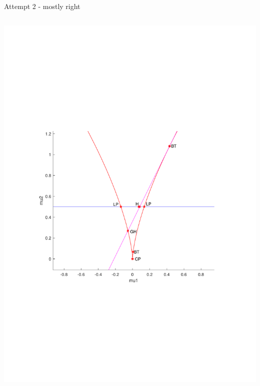 \documentclass{beamer}
\begin{document}
\begin{frame}[label={sec:org45577ca}]{Attempt 2 - mostly right}
\begin{columns}
\begin{column}{0.6\columnwidth}
\begin{center}
\includegraphics[trim={4cm 8cm 3cm 9cm}, clip,height=.8\textheight]{krassV2.pdf}
\end{center}
\end{column}
\end{columns}
\end{frame}
\end{document}
